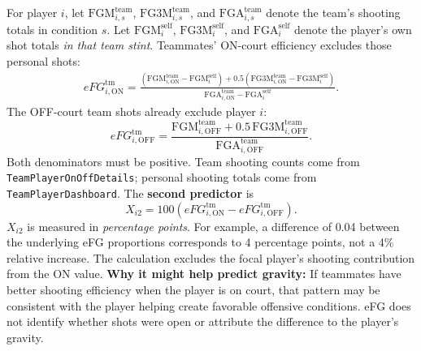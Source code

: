 \documentclass[11pt]{article}
\begin{document}
For player $i$, let $\mathrm{FGM}^{\mathrm{team}}_{i,s}$,
$\mathrm{FG3M}^{\mathrm{team}}_{i,s}$, and
$\mathrm{FGA}^{\mathrm{team}}_{i,s}$ denote the team's shooting totals
in condition $s$. Let $\mathrm{FGM}^{\mathrm{self}}_i$,
$\mathrm{FG3M}^{\mathrm{self}}_i$, and $\mathrm{FGA}^{\mathrm{self}}_i$
denote the player's own shot totals \emph{in that team stint}. Teammates'
ON-court efficiency excludes those personal shots:
\begin{equation}
\begin{split}
 eFG^{\mathrm{tm}}_{i,\mathrm{ON}}=
 \frac{
 (\mathrm{FGM}^{\mathrm{team}}_{i,\mathrm{ON}}-\mathrm{FGM}^{\mathrm{self}}_i)
 +0.5(\mathrm{FG3M}^{\mathrm{team}}_{i,\mathrm{ON}}-\mathrm{FG3M}^{\mathrm{self}}_i)
 }{
 \mathrm{FGA}^{\mathrm{team}}_{i,\mathrm{ON}}-\mathrm{FGA}^{\mathrm{self}}_i
 }.
\end{split}
\label{eq:efg-on}
\end{equation}
The OFF-court team shots already exclude player $i$:
\begin{equation}
 eFG^{\mathrm{tm}}_{i,\mathrm{OFF}}=
 \frac{\mathrm{FGM}^{\mathrm{team}}_{i,\mathrm{OFF}}
 +0.5\,\mathrm{FG3M}^{\mathrm{team}}_{i,\mathrm{OFF}}}
 {\mathrm{FGA}^{\mathrm{team}}_{i,\mathrm{OFF}}}.
 \label{eq:efg-off}
\end{equation}
Both denominators must be positive. Team shooting counts come from
\texttt{TeamPlayerOnOffDetails}; personal shooting totals come from
\texttt{TeamPlayerDashboard}. The \textbf{second predictor} is
\begin{equation}
 \boxed{X_{i2}=100\left(eFG^{\mathrm{tm}}_{i,\mathrm{ON}}
 -eFG^{\mathrm{tm}}_{i,\mathrm{OFF}}\right).}
 \label{eq:efg-diff}
\end{equation}
$X_{i2}$ is measured in \emph{percentage points}. For example, a difference
of 0.04 between the underlying eFG proportions corresponds to 4 percentage
points, not a 4\% relative increase. The calculation excludes the focal
player's shooting contribution from the ON value.
\textbf{Why it might help predict gravity:} If teammates have better
shooting efficiency when the player is on court, that pattern may be
consistent with the player helping create favorable offensive conditions.
eFG does not identify whether shots were open or attribute the difference
to the player's gravity.
\end{document}

